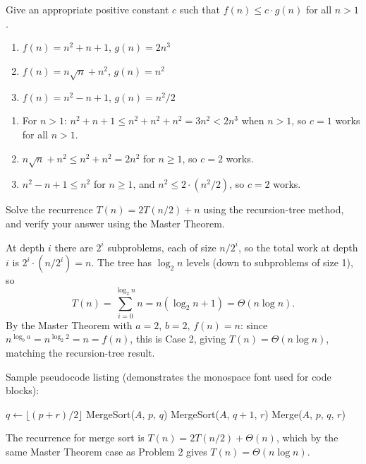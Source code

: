 \documentclass{article}
\title{
    \textmd{\textbf{\hmwkClass\ \hmwkTitle}}\\
    \textmd{\textbf{\hmwkSubTitle}}\\
    \normalsize\vspace{0.1in}\small{\hmwkCompleteTime}\\
    \vspace{0.1in}\large{\textit{\hmwkClassInstructor\ }}\\
    \vspace{1in}
}
\author{\hmwkAuthorName \\
	\hmwkAuthorStuID}
\date{}
\begin{document}
\maketitle

\begin{homeworkProblem}
	Give an appropriate positive constant $c$ such that $f(n) \leq c \cdot
	g(n)$ for all $n > 1$.

	\begin{enumerate}
		\item $f(n) = n^2 + n + 1$, $g(n) = 2n^3$
		\item $f(n) = n\sqrt{n} + n^2$, $g(n) = n^2$
		\item $f(n) = n^2 - n + 1$, $g(n) = n^2 / 2$
	\end{enumerate}

	\solution

	\begin{enumerate}
		\item For $n > 1$: $n^2 + n + 1 \le n^2 + n^2 + n^2 = 3n^2 < 2n^3$
		when $n > 1$, so $c = 1$ works for all $n > 1$.
		\item $n\sqrt{n} + n^2 \le n^2 + n^2 = 2n^2$ for $n \ge 1$, so $c=2$
		works.
		\item $n^2 - n + 1 \le n^2$ for $n \ge 1$, and $n^2 \le 2 \cdot
		(n^2/2)$, so $c = 2$ works.
	\end{enumerate}
\end{homeworkProblem}

\begin{homeworkProblem}
	Solve the recurrence $T(n) = 2T(n/2) + n$ using the recursion-tree
	method, and verify your answer using the Master Theorem.

	\solution

	At depth $i$ there are $2^i$ subproblems, each of size $n/2^i$, so
	the total work at depth $i$ is $2^i \cdot (n/2^i) = n$. The tree has
	$\log_2 n$ levels (down to subproblems of size 1), so
	\begin{equation}
		T(n) = \sum_{i=0}^{\log_2 n} n = n(\log_2 n + 1) = \Theta(n\log n).
	\end{equation}
	By the Master Theorem with $a = 2$, $b = 2$, $f(n) = n$: since
	$n^{\log_b a} = n^{\log_2 2} = n = f(n)$, this is Case 2, giving
	$T(n) = \Theta(n \log n)$, matching the recursion-tree result.
\end{homeworkProblem}

\begin{homeworkProblem}
	Sample pseudocode listing (demonstrates the monospace font used for
	code blocks):
	\begin{algorithm}
		\caption{MergeSort($A$, $p$, $r$)}
		\begin{algorithmic}[1]
				\State $q \gets \lfloor (p+r)/2 \rfloor$
				\State MergeSort($A$, $p$, $q$)
				\State MergeSort($A$, $q+1$, $r$)
				\State Merge($A$, $p$, $q$, $r$)
			\EndIf
		\end{algorithmic}
	\end{algorithm}

	\solution

	The recurrence for merge sort is $T(n) = 2T(n/2) + \Theta(n)$, which
	by the same Master Theorem case as Problem 2 gives
	$T(n) = \Theta(n \log n)$.
\end{homeworkProblem}
\end{document}
